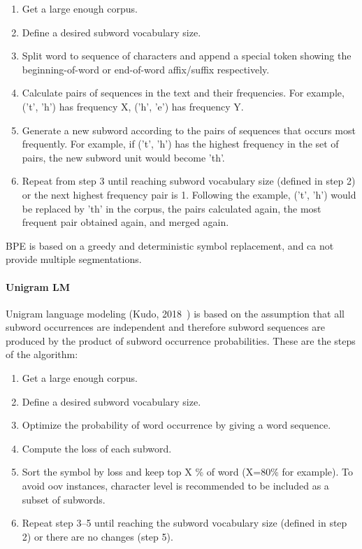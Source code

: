 \begin{enumerate}
    \item Get a large enough corpus.
    \item Define a desired subword vocabulary size.
    \item Split word to sequence of characters and append a special token showing the beginning-of-word or end-of-word affix/suffix respectively.
    \item Calculate pairs of sequences in the text and their frequencies. For example, ('t', 'h') has frequency X, ('h', 'e') has frequency Y.
    \item Generate a new subword according to the pairs of sequences that occurs most frequently. For example, if ('t', 'h') has the highest frequency in the set of pairs, the new subword unit would become 'th'.
    \item Repeat from step 3 until reaching subword vocabulary size (defined in step 2) or the next highest frequency pair is 1. Following the example, ('t', 'h') would be replaced by 'th' in the corpus, the pairs calculated again, the most frequent pair obtained again, and merged again.
\end{enumerate}

BPE is based on a greedy and deterministic symbol replacement, and ca not provide multiple segmentations.

\paragraph{Unigram LM}\label{subsubsec:unigramlm}

Unigram language modeling (Kudo, 2018~\cite{kudo-2018-subword}) is based on the assumption that all subword occurrences are independent and therefore subword sequences are produced by the product of subword occurrence probabilities. These are the steps of the algorithm:

\begin{enumerate}
    \item Get a large enough corpus.
    \item Define a desired subword vocabulary size.
    \item Optimize the probability of word occurrence by giving a word sequence.
    \item Compute the loss of each subword.
    \item Sort the symbol by loss and keep top X \% of word (X=80\% for example). To avoid oov instances, character level is recommended to be included as a subset of subwords.
    \item Repeat step 3–5 until reaching the subword vocabulary size (defined in step 2) or there are no changes (step 5).
\end{enumerate}

